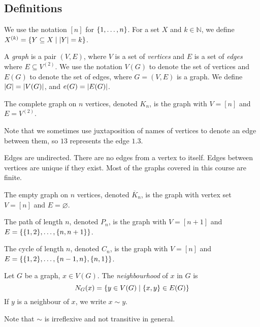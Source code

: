 \subsection{Definitions}
We use the notation \( [n] \) for \( \qty{1, \dots,n} \).
For a set \( X \) and \( k \in \mathbb N \), we define \( X^{(k)} = \qty{Y \subseteq X \mid \abs{Y} = k} \).
\begin{definition}
	A \emph{graph} is a pair \( (V, E) \), where \( V \) is a set of \emph{vertices} and \( E \) is a set of \emph{edges} where \( E \subseteq V^{(2)} \).
	We use the notation \( V(G) \) to denote the set of vertices and \( E(G) \) to denote the set of edges, where \( G = (V, E) \) is a graph.
	We define \( \abs{G} = \abs{V(G)} \), and \( e(G) = \abs{E(G)} \).
\end{definition}
\begin{example}
	The complete graph on \( n \) vertices, denoted \( K_n \), is the graph with \( V = [n] \) and \( E = V^{(2)} \).
\end{example}
Note that we sometimes use juxtaposition of names of vertices to denote an edge between them, so \( 13 \) represents the edge \( \qty{1, 3} \).
\begin{remark}
	Edges are undirected. There are no edges from a vertex to itself. Edges between vertices are unique if they exist.
	Most of the graphs covered in this course are finite.
\end{remark}
\begin{example}
	The empty graph on \( n \) vertices, denoted \( \overline K_n \), is the graph with vertex set \( V = [n] \) and \( E = \varnothing \).
\end{example}
\begin{example}
	The path of length \( n \), denoted \( P_n \), is the graph with \( V = [n+1] \) and \( E = \qty{\qty{1,2},\dots,\qty{n,n+1}} \).
\end{example}
\begin{example}
	The cycle of length \( n \), denoted \( C_n \), is the graph with \( V = [n] \) and \( E = \qty{\qty{1,2}, \dots, \qty{n-1,n}, \qty{n,1}} \).
\end{example}
\begin{definition}
	Let \( G \) be a graph, \( x \in V(G) \).
	The \emph{neighbourhood} of \( x \) in \( G \) is
	\[ N_G(x) = \qty{y \in V(G) \mid \qty{x,y} \in E(G)} \]
	If \( y \) is a neighbour of \( x \), we write \( x \sim y \).
\end{definition}
Note that \( \sim \) is irreflexive and not transitive in general.
